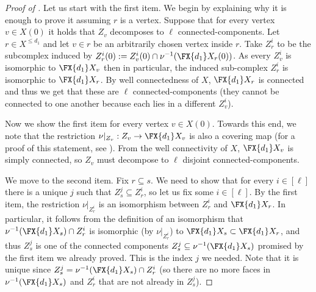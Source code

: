 \begin{proof}[Proof of ]
Let us start with the first item. We begin by explaining why it is enough to prove it assuming \(r\) is a vertex. Suppose that for every vertex \(v \in X(0)\) it holds that \(Z_v\) decomposes to \(\ell\) connected-components. Let \(r \in X^{\leq d_1}\) and let \(v \in r\) be an arbitrarily chosen vertex inside \(r\). Take \(Z_r^i\) to be the subcomplex induced by \(Z_r^i(0) := Z_v^i(0) \cap \nu^{-1}(\FX{d_1}X_r(0))\). As every \(Z_v^i\) is isomorphic to \(\FX{d_1}X_v\) then in particular, the induced sub-complex \(Z_r^i\) is isomorphic to \(\FX{d_1}X_{r}\). By well connectedness of \(X\), \(\FX{d_1}X_r\) is connected and thus we get that these are \(\ell\) connected-components (they cannot be connected to one another because each lies in a different \(Z_v^i\)).

Now we show the first item for every vertex \(v \in X(0)\). Towards this end, we note that the restriction \(\nu|_{Z_v}:Z_v \to \FX{d_1}X_v\) is also a covering map (for a proof of this statement, see ). From the well connectivity of \(X\), \(\FX{d_1}X_v\) is simply connected, so \(Z_v\) must decompose to \(\ell\) disjoint connected-components. 

We move to the second item. Fix \(r \subseteq s\). We need to show that for every \(i \in [\ell]\) there is a unique \(j\) such that \(Z_s^j \subseteq Z_r^i\), so let us fix some \(i \in [\ell]\). By the first item, the restriction \(\nu|_{Z_r^i}\) is an isomorphism between \(Z_r^i\) and \(\FX{d_1}X_r\). In particular, it follows from the definition of an isomorphism that \(\nu^{-1}(\FX{d_1}X_s) \cap Z_r^i\) is isomorphic (by \(\nu|_{Z_r^i}\)) to \(\FX{d_1}X_s\subset \FX{d_1}X_r\), and thus \(Z_s^j\) is one of the connected components \(Z_s^j \subseteq \nu^{-1}(\FX{d_1}X_s)\) promised by the first item we already proved. This is the index \(j\) we needed. Note that it is unique since \(Z_s^j = \nu^{-1}(\FX{d_1}X_s) \cap Z_r^i\) (so there are no more faces in \(\nu^{-1}(\FX{d_1}X_s)\) and  \(Z_r^i\) that are not already in \(Z_s^j\)).
\end{proof}
%
%

